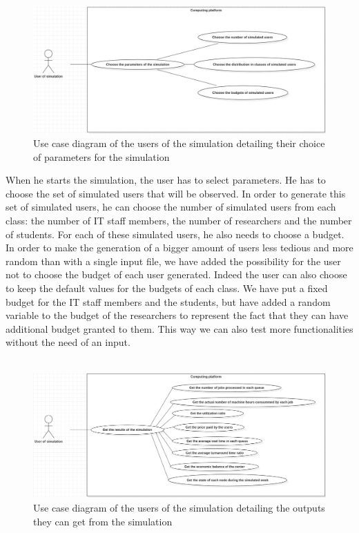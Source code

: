 \documentclass [10 pt, a4 paper]{report}
\begin{document}
\begin{figure}[!htbp]
\centering
\includegraphics[width=1.2\textwidth]{UCD4.jpg}
\caption{\label{fig:image} Use case diagram of the users of the simulation detailing their choice of parameters for the simulation}
\end{figure}

\clearpage
\noindent
When he starts the simulation, the user has to select parameters. He has to choose the set of simulated users that will be observed. In order to generate this set of simulated users, he can choose the number of simulated users from each class: the number of IT staff members, the number of researchers and the number of students. For each of these simulated users, he also needs to choose a budget. In order to make the generation of a bigger amount of users less tedious and more random than with a single input file, we have added the possibility for the user not to choose the budget of each user generated. Indeed the user can also choose to keep the default values for the budgets of each class. We have put a fixed budget for the IT staff members and the students, but have added a random variable to the budget of the researchers to represent the fact that they can have additional budget granted to them. This way we can also test more functionalities without the need of an input. \\ \\

\begin{figure}[!htbp]
\centering
\includegraphics[width=1.2\textwidth]{UCD3.jpg}
\caption{\label{fig:image} Use case diagram of the users of the simulation detailing the outputs they can get from the simulation}
\end{figure}
\end{document}

